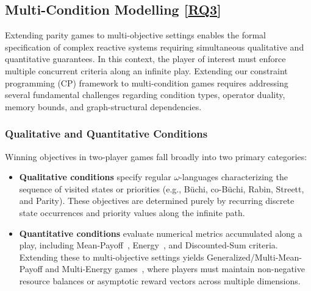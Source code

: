 \documentclass{article}
\begin{document}


\subsection{Multi-Condition Modelling [\hyperref[sec:rq]{RQ3}]}\label{sec:multicondition_modelling}

Extending parity games to multi-objective settings enables the formal specification of complex reactive systems requiring simultaneous qualitative and quantitative guarantees. In this context, the player of interest must enforce multiple concurrent criteria along an infinite play. Extending our constraint programming (CP) framework to multi-condition games requires addressing several fundamental challenges regarding condition types, operator duality, memory bounds, and graph-structural dependencies.

\subsubsection{Qualitative and Quantitative Conditions}
Winning objectives in two-player games fall broadly into two primary categories:
\begin{itemize}
    \item \textbf{Qualitative conditions} specify regular $\omega$-languages characterizing the sequence of visited states or priorities (e.g., Büchi, co-Büchi, Rabin, Streett, and Parity). These objectives are determined purely by recurring discrete state occurrences and priority values along the infinite path.
    \item \textbf{Quantitative conditions} evaluate numerical metrics accumulated along a play, including Mean-Payoff~\cite{Daviaud:2018}, Energy~\cite{Chatterjee:2010EP}, and Discounted-Sum criteria. Extending these to multi-objective settings yields Generalized/Multi-Mean-Payoff and Multi-Energy games~\cite{Chatterjee:2010:GMaE,Velner:2015}, where players must maintain non-negative resource balances or asymptotic reward vectors across multiple dimensions.
\end{itemize}
\end{document}

